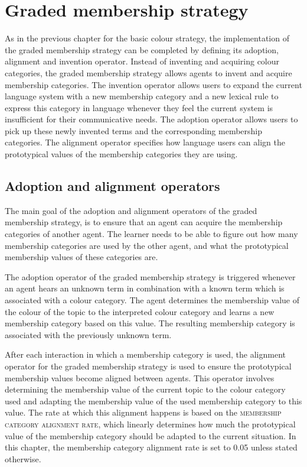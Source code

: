 \chapter{Graded membership strategy}
\label{s:graded-operators}

As in the previous chapter for the basic colour strategy, the
implementation of the graded membership strategy can be
completed by defining its adoption, alignment and invention
operator. Instead of inventing and acquiring colour categories, the
graded membership strategy allows agents to invent and acquire
membership categories. The invention operator allows users to expand
the current language system with a new membership category and a new
lexical rule to express this category in language whenever they feel
the current system is insufficient for their communicative needs. The
adoption operator allows users to pick up these newly invented terms
and the corresponding membership categories. The alignment operator
specifies how language users can align the prototypical values of the
membership categories they are using.

\section{Adoption and alignment operators}

The main goal of the adoption and alignment operators of the graded
membership strategy, is to ensure that an agent can acquire the
membership categories of another agent. The learner needs to be able
to figure out how many membership categories are used by the other
agent, and what the prototypical membership values of these categories
are.

The adoption operator 
of the graded membership strategy is triggered
whenever an agent hears an unknown term in combination with a known
term which is associated with a colour category. The agent determines
the membership value of the colour of the topic to the interpreted colour
category and learns a new membership category based on this 
value. The resulting membership category is associated with the
previously unknown term.

After each interaction in which a membership category is used, the
alignment operator
for the graded membership strategy is
used to ensure the prototypical membership values become aligned between agents. This
operator involves determining the membership value of the current
topic to the colour category used and adapting the membership value of the
used membership category to this value. The rate at which this
alignment happens is based on the \textsc{membership category alignment rate},
which linearly
determines how much the prototypical value of the membership category
should be adapted to the current situation. In this chapter, the membership category
alignment rate is set to 0.05 unless stated otherwise.

